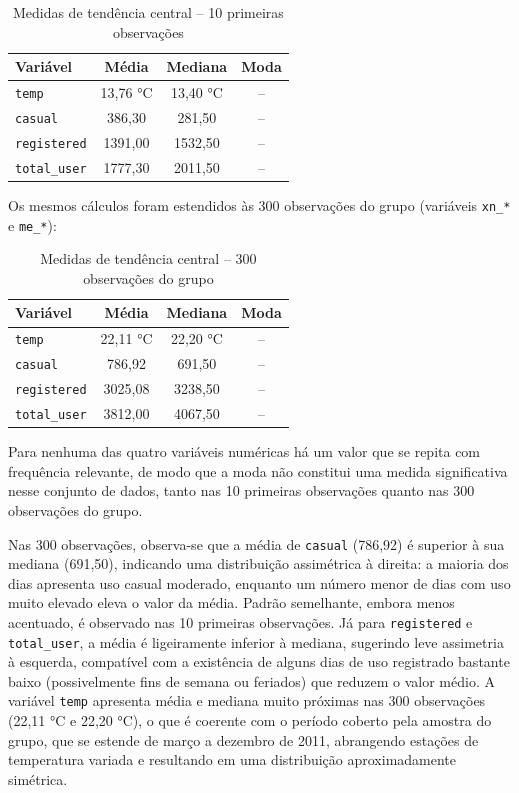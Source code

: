 \documentclass[10pt, a4paper]{article}
\begin{document}
\begin{table}[h]
\centering
\caption{Medidas de tendência central -- 10 primeiras observações}
\label{tab:tendencia-central-10}
\begin{tabular}{lccc}
\hline
\textbf{Variável} & \textbf{Média} & \textbf{Mediana} & \textbf{Moda} \\
\hline
\texttt{temp}        & 13,76 °C & 13,40 °C & -- \\
\texttt{casual}      & 386,30   & 281,50   & -- \\
\texttt{registered}  & 1391,00  & 1532,50  & -- \\
\texttt{total\_user} & 1777,30  & 2011,50  & -- \\
\hline
\end{tabular}
\end{table}

Os mesmos cálculos foram estendidos às 300 observações do grupo (variáveis \texttt{xn\_*} e \texttt{me\_*}):

\begin{table}[h]
\centering
\caption{Medidas de tendência central -- 300 observações do grupo}
\label{tab:tendencia-central-300}
\begin{tabular}{lccc}
\hline
\textbf{Variável} & \textbf{Média} & \textbf{Mediana} & \textbf{Moda} \\
\hline
\texttt{temp}        & 22,11 °C & 22,20 °C & -- \\
\texttt{casual}      & 786,92   & 691,50   & -- \\
\texttt{registered}  & 3025,08  & 3238,50  & -- \\
\texttt{total\_user} & 3812,00  & 4067,50  & -- \\
\hline
\end{tabular}
\end{table}

Para nenhuma das quatro variáveis numéricas há um valor que se repita com frequência relevante, de modo que a moda não constitui uma medida significativa nesse conjunto de dados, tanto nas 10 primeiras observações quanto nas 300 observações do grupo.

Nas 300 observações, observa-se que a média de \texttt{casual} (786,92) é superior à sua mediana (691,50), indicando uma distribuição assimétrica à direita: a maioria dos dias apresenta uso casual moderado, enquanto um número menor de dias com uso muito elevado eleva o valor da média. Padrão semelhante, embora menos acentuado, é observado nas 10 primeiras observações. Já para \texttt{registered} e \texttt{total\_user}, a média é ligeiramente inferior à mediana, sugerindo leve assimetria à esquerda, compatível com a existência de alguns dias de uso registrado bastante baixo (possivelmente fins de semana ou feriados) que reduzem o valor médio. A variável \texttt{temp} apresenta média e mediana muito próximas nas 300 observações (22,11 °C e 22,20 °C), o que é coerente com o período coberto pela amostra do grupo, que se estende de março a dezembro de 2011, abrangendo estações de temperatura variada e resultando em uma distribuição aproximadamente simétrica.
\end{document}
